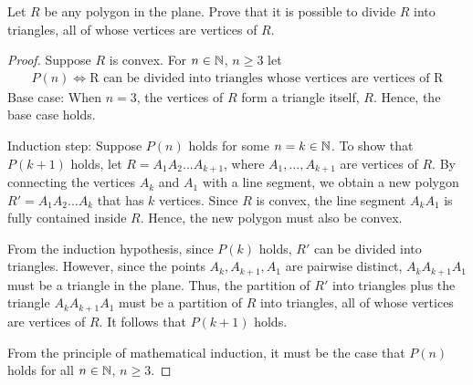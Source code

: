 \begin{question}	
	\normalfont
Let $R$ be any polygon in the plane. Prove that it is possible to divide $R$ into triangles, all of whose vertices are vertices of $R$.
\end{question}

\begin{proof}
    \renewcommand{\qedsymbol}{$\blacksquare$}
    Suppose $R$ is convex.
    For $n\in\mathbb N$, $n\geq 3$ let 
    \[
        \begin{aligned}
            P(n)\iff \text{R can be divided into triangles whose vertices are vertices of R}
        \end{aligned}
    \]
    Base case: When $n=3$, the vertices of $R$ form a triangle itself, $R$.
    Hence, the base case holds.

    Induction step: Suppose $P(n)$ holds for some $n=k\in\mathbb N$.
    To show that $P(k+1)$ holds, let $R=A_1A_2...A_{k+1}$, where $A_1,...,A_{k+1}$ are vertices of $R$.
    By connecting the vertices $A_k$ and $A_1$ with a line segment, we obtain a new polygon $R'=A_1A_2...A_k$ that has $k$ vertices.
    Since $R$ is convex, the line segment $A_kA_1$ is fully contained inside $R$.
    Hence, the new polygon must also be convex.

    From the induction hypothesis, since $P(k)$ holds, $R'$ can be divided into triangles.
    However, since the points $A_k,A_{k+1},A_1$ are pairwise distinct, $A_kA_{k+1}A_1$ must be a triangle in the plane.
    Thus, the partition of $R'$ into triangles plus the triangle $A_kA_{k+1}A_1$ must be a partition of $R$ into triangles, all of whose vertices are vertices of $R$.
    It follows that $P(k+1)$ holds.

    From the principle of mathematical induction, it must be the case that $P(n)$ holds for all $n\in\mathbb N$, $n\geq 3$.
\end{proof}
